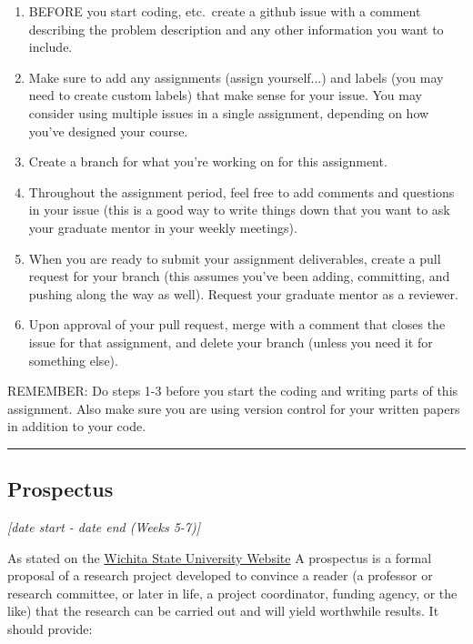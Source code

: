 \documentclass[12pt]{article}
\begin{document}
\begin{enumerate}
	\item BEFORE you start coding, etc.~create a github issue with a comment describing the problem description and any other information you want to include.
	\item Make sure to add any assignments (assign yourself...) and labels (you may need to create custom labels) that make sense for your issue. You may consider using multiple issues in a single assignment, depending on how you've designed your course.
	\item Create a branch for what you're working on for this assignment.
	\item Throughout the assignment period, feel free to add comments and questions in your issue (this is a good way to write things down that you want to ask your graduate mentor in your weekly meetings).
	\item When you are ready to submit your assignment deliverables, create a pull request for your branch (this assumes you've been adding, committing, and pushing along the way as well). Request your graduate mentor as a reviewer.
	\item Upon approval of your pull request, merge with a comment that closes the issue for that assignment, and delete your branch (unless you need it for something else).
\end{enumerate}

\noindent REMEMBER: Do steps 1-3 before you start the coding and writing parts of this assignment. Also make sure you are using version control for your written papers in addition to your code.


\vspace{1em}\hrule\vspace{1em}
\subsection{Prospectus}
\label{ssec:prospectus}
\textit{[date start - date end (Weeks 5-7)]}

\bigskip

As stated on the \href{https://www.wichita.edu/academics/fairmount_college_of_liberal_arts_and_sciences/english/deptenglish/WritingaResearchProspectus.php#:~:text=A%20prospectus%20is%20a%20formal,and%20will%20yield%20worthwhile%20results.}{Wichita State University Website}
A prospectus is a formal proposal of a research project developed to convince a reader (a professor or research committee, or later in life, a project coordinator, funding agency, or the like) that the research can be carried out and will yield worthwhile results. It should provide:
\end{document}
